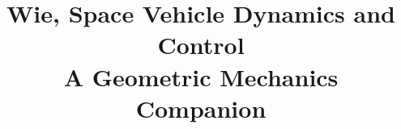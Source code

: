 
\title{Wie, Space Vehicle Dynamics and Control\\A Geometric Mechanics Companion}

\maketitle
\begin{notesbody}
\tableofcontents






\end{notesbody}


